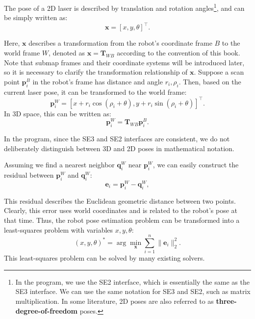 The pose of a 2D laser is described by translation and rotation angles\footnote{In the program, we use the SE2 interface, which is essentially the same as the SE3 interface. We can use the same notation for SE3 and SE2, such as matrix multiplication. In some literature, 2D poses are also referred to as \textbf{three-degree-of-freedom} poses.}, and can be simply written as:
\begin{equation}\label{key}
	\mathbf{x} = [x, y, \theta]^\top.
\end{equation}

Here, $\mathbf{x}$ describes a transformation from the robot's coordinate frame $B$ to the world frame $W$, denoted as $\mathbf{x} = \mathbf{T}_{WB}$ according to the convention of this book. Note that submap frames and their coordinate systems will be introduced later, so it is necessary to clarify the transformation relationship of $\mathbf{x}$. Suppose a scan point $\mathbf{p}_i^B$ in the robot's frame has distance and angle $r_i, \rho_i$. Then, based on the current laser pose, it can be transformed to the world frame:
\begin{equation}\label{key}
	\mathbf{p}^W_i = [x+r_i \cos (\rho_i + \theta), y+r_i \sin(\rho_i + \theta)]^\top.
\end{equation}
In 3D space, this can be written as:
\begin{equation}\label{key}
	\mathbf{p}^W_i = \mathbf{T}_{WB} \mathbf{p}^B_i.
\end{equation}

In the program, since the SE3 and SE2 interfaces are consistent, we do not deliberately distinguish between 3D and 2D poses in mathematical notation.

Assuming we find a nearest neighbor $\mathbf{q}_i^W$ near $\mathbf{p}_i^W$, we can easily construct the residual between $\mathbf{p}_i^W$ and $\mathbf{q}_i^W$:
\begin{equation}\label{key}
	\mathbf{e}_i = \mathbf{p}_i^W - \mathbf{q}_i^W,
\end{equation}

This residual describes the Euclidean geometric distance between two points. Clearly, this error uses world coordinates and is related to the robot's pose at that time. Thus, the robot pose estimation problem can be transformed into a least-squares problem with variables $x, y, \theta$:
\begin{equation}\label{key}
	(x,y,\theta)^* = \arg \min\limits_{\mathbf{x}} \sum_{i=1}^n \| \mathbf{e}_i \|_2^2.
\end{equation}
This least-squares problem can be solved by many existing solvers.

